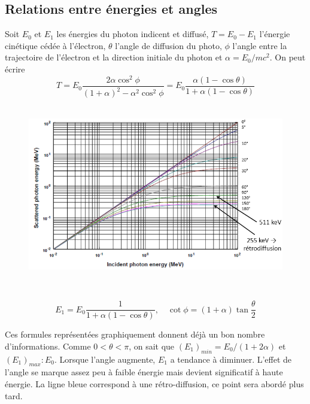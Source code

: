 \subsection{Relations entre énergies et angles}%
Soit $E_0$ et $E_1$ les énergies du photon indicent et diffusé, $T=E_0-E_1$ l'énergie cinétique 
cédée à l'électron, $\theta$ l'angle de diffusion du photo, $\phi$ l'angle entre la trajectoire de
l'électron et la direction initiale du photon et $\alpha=E_0/mc^2$. On peut écrire
\begin{equation}
T=E_0\frac{2\alpha \cos^2\phi}{(1+\alpha)^2-\alpha^2\cos^2\phi}=E_0\frac{\alpha(1-\cos\theta)}{1+\alpha(1-\cos\theta)}
\end{equation}\ 

	\begin{figure}
	\vspace{5mm}
	\includegraphics[scale=0.45]{ch4/image3}
	\end{figure}
	\ 
	
\begin{equation}
E_1=E_0\frac{1}{1+\alpha (1-\cos\theta)},\quad 
\cot\phi=(1+\alpha)\tan\frac{\theta}{2}
\end{equation}

Ces formules représentées graphiquement donnent déjà un bon nombre d'informations. Comme $0<\theta<
\pi$, on sait que $(E_1)_{min} = E_0/(1+2\alpha)$ et $(E_1)_{max} : E_0$. Lorsque l'angle augmente, 
$E_1$ a tendance à diminuer. L'effet de l'angle se marque assez peu à faible énergie mais devient
significatif à haute énergie. La ligne bleue correspond à une rétro-diffusion, ce point sera
abordé plus tard.

